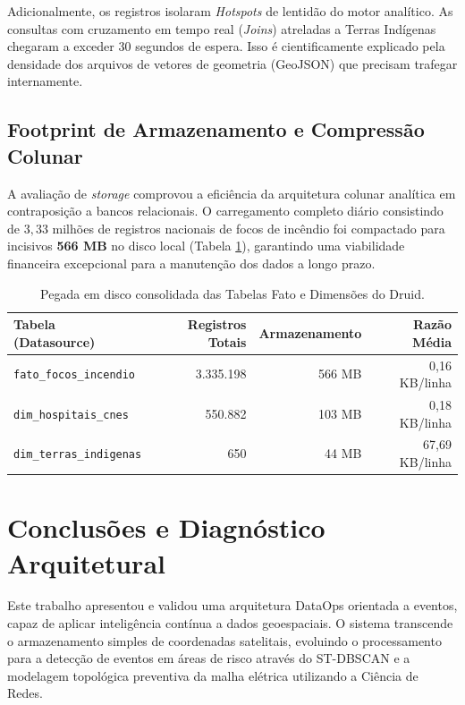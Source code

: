 \documentclass[12pt]{article}
\begin{document}
Adicionalmente, os registros isolaram \textit{Hotspots} de lentidão do motor analítico. As consultas com cruzamento em tempo real (\textit{Joins}) atreladas a Terras Indígenas chegaram a exceder 30 segundos de espera. Isso é cientificamente explicado pela densidade dos arquivos de vetores de geometria (GeoJSON) que precisam trafegar internamente. 

\subsection{Footprint de Armazenamento e Compressão Colunar}

A avaliação de \textit{storage} comprovou a eficiência da arquitetura colunar analítica em contraposição a bancos relacionais. O carregamento completo diário consistindo de $3,33$ milhões de registros nacionais de focos de incêndio foi compactado para incisivos \textbf{566 MB} no disco local (Tabela \ref{tab:storage_footprint}), garantindo uma viabilidade financeira excepcional para a manutenção dos dados a longo prazo.

\begin{table}[H]
\centering
\caption{Pegada em disco consolidada das Tabelas Fato e Dimensões do Druid.}
\label{tab:storage_footprint}
\begin{tabular}{lrrr}
\toprule
\textbf{Tabela (Datasource)} & \textbf{Registros Totais} & \textbf{Armazenamento} & \textbf{Razão Média} \\ \midrule
\texttt{fato\_focos\_incendio} & 3.335.198 & 566 MB & 0,16 KB/linha \\
\texttt{dim\_hospitais\_cnes} & 550.882 & 103 MB & 0,18 KB/linha \\
\texttt{dim\_terras\_indigenas} & 650 & 44 MB & 67,69 KB/linha \\
\bottomrule
\end{tabular}
\end{table}

\section{Conclusões e Diagnóstico Arquitetural}

Este trabalho apresentou e validou uma arquitetura DataOps orientada a eventos, capaz de aplicar inteligência contínua a dados geoespaciais. O sistema transcende o armazenamento simples de coordenadas satelitais, evoluindo o processamento para a detecção de eventos em áreas de risco através do ST-DBSCAN e a modelagem topológica preventiva da malha elétrica utilizando a Ciência de Redes.
\end{document}
